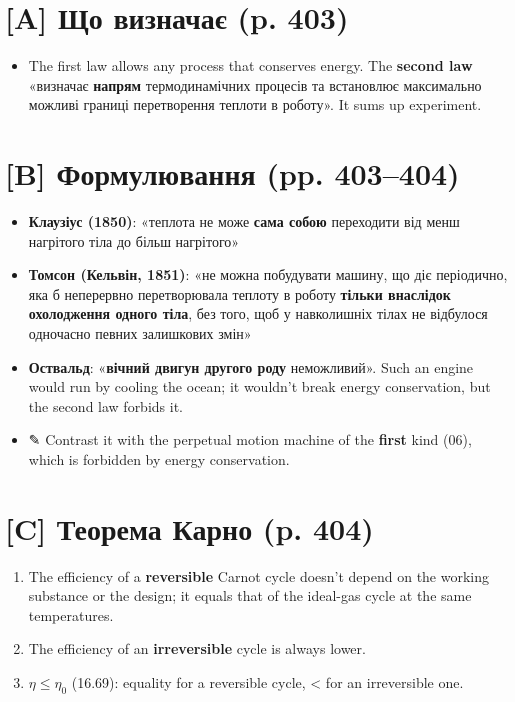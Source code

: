 \documentclass[11pt,a4paper,oneside]{book}
\newcommand{\pen}{{\sffamily\color{accent}✎}}
\begin{document}
\section*{[A] Що визначає (p. 403)}
\begin{itemize}
\item The first law allows any process that conserves energy. The \textbf{second law} «визначає \textbf{напрям} термодинамічних процесів та встановлює максимально можливі границі перетворення теплоти в роботу». It sums up experiment.
\end{itemize}

\section*{[B] Формулювання (pp. 403–404)}
\begin{itemize}
\item \textbf{Клаузіус (1850)}: «теплота не може \textbf{сама собою} переходити від менш нагрітого тіла до більш нагрітого»
\item \textbf{Томсон (Кельвін, 1851)}: «не можна побудувати машину, що діє періодично, яка б неперервно перетворювала теплоту в роботу \textbf{тільки внаслідок охолодження одного тіла}, без того, щоб у навколишніх тілах не відбулося одночасно певних залишкових змін»
\item \textbf{Оствальд}: «\textbf{вічний двигун другого роду} неможливий». Such an engine would run by cooling the ocean; it wouldn't break energy conservation, but the second law forbids it.
\item \pen{} Contrast it with the perpetual motion machine of the \textbf{first} kind (06), which is forbidden by energy conservation.
\end{itemize}

\section*{[C] Теорема Карно (p. 404)}
\begin{enumerate}
\item The efficiency of a \textbf{reversible} Carnot cycle doesn't depend on the working substance or the design; it equals that of the ideal-gas cycle at the same temperatures.
\item The efficiency of an \textbf{irreversible} cycle is always lower.
\item $\eta \le \eta_0$ (16.69): equality for a reversible cycle, < for an irreversible one.
\end{enumerate}
\end{document}
